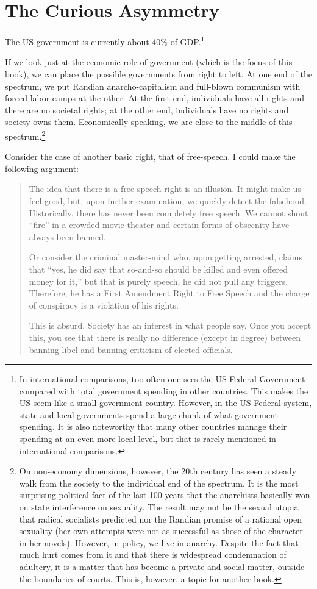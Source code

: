 \chapter{The Curious Asymmetry}

The US government is currently about 40\% of GDP.\footnote{In international
comparisons, too often one sees the US Federal Government compared with total
government spending in other countries. This makes the US seem like a
small-government country. However, in the US Federal system, state and local
governments spend a large chunk of what government spending. It is also
noteworthy that many other countries manage their spending at an even more
local level, but that is rarely mentioned in international comparisons.}

If we look just at the economic role of government (which is the focus of this
book), we can place the possible governments from right to left. At one end of
the spectrum, we put Randian anarcho-capitalism and full-blown communism with
forced labor camps at the other. At the first end, individuals have all rights
and there are no societal rights; at the other end, individuals have no rights
and society owns them. Economically speaking, we are close to the middle of
this spectrum.\footnote{On non-economy dimensions, however, the 20th century
has seen a steady walk from the society to the individual end of the spectrum.
It is the most surprising political fact of the last 100 years that the
anarchists basically won on state interference on sexuality. The result may not
be the sexual utopia that radical socialists predicted nor the Randian promise
of a rational open sexuality (her own attempts were not as successful as those
of the character in her novels). However, in policy, we live in anarchy.
Despite the fact that much hurt comes from it and that there is widespread
condemnation of adultery, it is a matter that has become a private and social
matter, outside the boundaries of courts. This is, however, a topic for another
book.}

Consider the case of another basic right, that of free-speech. I could make the
following argument:

\begin{quote}
The idea that there is a free-speech right is an illusion. It might make us
feel good, but, upon further examination, we quickly detect the falsehood.
Historically, there has never been completely free speech. We cannot shout
``fire'' in a crowded movie theater and certain forms of obscenity have always
been banned.

Or consider the criminal master-mind who, upon getting arrested, claims that
``yes, he did say that so-and-so should be killed and even offered money for
it,'' but that is purely speech, he did not pull any triggers. Therefore, he
has a First Amendment Right to Free Speech and the charge of conspiracy is a
violation of his rights.

This is absurd. Society has an interest in what people say. Once you accept
this, you see that there is really no difference (except in degree) between
banning libel and banning criticism of elected officials.
\end{quote}

